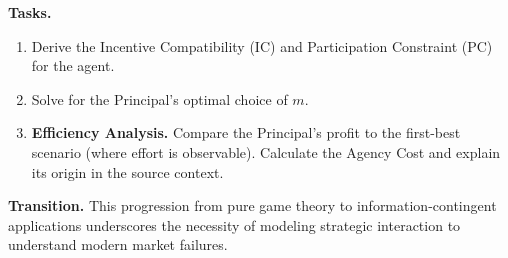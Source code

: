 \documentclass[12pt,a4paper]{article}
\begin{document}
\noindent\textbf{Tasks.}
\begin{enumerate}
  \item Derive the Incentive Compatibility (IC) and Participation Constraint (PC) for the agent.
  \item Solve for the Principal's optimal choice of \(m\).
  \item \textbf{Efficiency Analysis.} Compare the Principal's profit to the first-best scenario (where effort is observable). Calculate the Agency Cost and explain its origin in the source context.
\end{enumerate}

\bigskip
\noindent\textbf{Transition.} This progression from pure game theory to information-contingent applications underscores the necessity of modeling strategic interaction to understand modern market failures.
\end{document}

